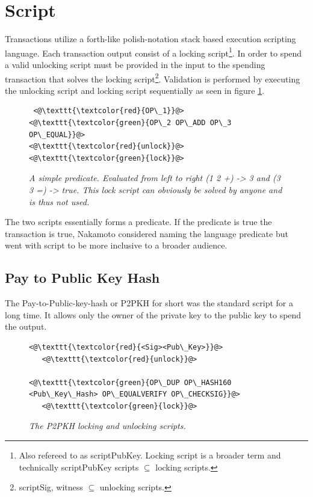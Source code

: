 \section{Script}

Transactions utilize a forth-like polish-notation stack based execution scripting language\cite{antonopoulos:mastering:bitcoin}. Each transaction output consist of a locking script\footnote{Also refereed to as scriptPubKey. Locking script is a broader term and technically scriptPubKey scripts $ \subseteq $ locking scripts.}. In order to spend a valid unlocking script must be provided in the input to the spending transaction that solves the locking script\footnote{scriptSig, witness $\subseteq $ unlocking scripts.}. Validation is performed by executing the unlocking script and locking script sequentially as seen in figure \ref{fig:simple:script}. 

\begin{figure}[!hbt]
	
	\begin{lstlisting}
 <@\texttt{\textcolor{red}{OP\_1}}@>   <@\texttt{\textcolor{green}{OP\_2 OP\_ADD OP\_3 OP\_EQUAL}}@>
<@\texttt{\textcolor{red}{unlock}}@>           <@\texttt{\textcolor{green}{lock}}@>
	\end{lstlisting}
	
	\caption{\textit{ A simple predicate. Evaluated from left to right (1 2 +) -> 3 and
			(3 3 =) -> true. This lock script can obviously be solved by anyone and is thus not used.
	}}
	\label{fig:simple:script}
\end{figure}

The two scripts essentially forms a predicate. If the predicate is true the transaction is true, Nakamoto considered naming the language predicate but went with script to be more inclusive to a broader audience\cite{nakamoto:predicate}.

\subsection{Pay to Public Key Hash}

The Pay-to-Public-key-hash or P2PKH for short was the standard script for a long time. It allows only the owner of 
the private key to the public key to spend the output.


\begin{figure}[!hbt]
	
	\begin{lstlisting}
<@\texttt{\textcolor{red}{<Sig><Pub\_Key>}}@>   
   <@\texttt{\textcolor{red}{unlock}}@>
   
<@\texttt{\textcolor{green}{OP\_DUP OP\_HASH160 <Pub\_Key\_Hash> OP\_EQUALVERIFY OP\_CHECKSIG}}@>
   <@\texttt{\textcolor{green}{lock}}@>
	\end{lstlisting}
	
	\caption{\textit{ The P2PKH locking and unlocking scripts.
	}}
	\label{fig:P2PKH}
\end{figure}

